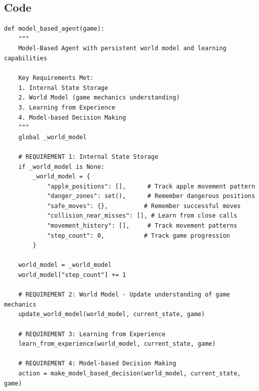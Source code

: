 \documentclass[11pt,a4paper]{article}
\begin{document}
\subsection{Code}
\begin{lstlisting}[caption=Model-Based Agent]
def model_based_agent(game):
    """
    Model-Based Agent with persistent world model and learning capabilities
    
    Key Requirements Met:
    1. Internal State Storage
    2. World Model (game mechanics understanding)  
    3. Learning from Experience
    4. Model-based Decision Making
    """
    global _world_model

    # REQUIREMENT 1: Internal State Storage
    if _world_model is None:
        _world_model = {
            "apple_positions": [],      # Track apple movement pattern
            "danger_zones": set(),      # Remember dangerous positions
            "safe_moves": {},          # Remember successful moves
            "collision_near_misses": [], # Learn from close calls
            "movement_history": [],     # Track movement patterns
            "step_count": 0,           # Track game progression
        }

    world_model = _world_model
    world_model["step_count"] += 1

    # REQUIREMENT 2: World Model - Update understanding of game mechanics
    update_world_model(world_model, current_state, game)

    # REQUIREMENT 3: Learning from Experience
    learn_from_experience(world_model, current_state, game)

    # REQUIREMENT 4: Model-based Decision Making
    action = make_model_based_decision(world_model, current_state, game)
\end{lstlisting}
\end{document}

